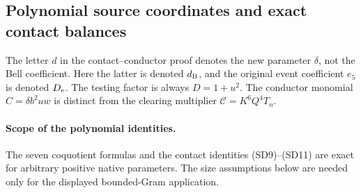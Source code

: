 \subsection{Polynomial source coordinates and exact contact balances}

\label{component:p0acdb66bba2f}

\label{p0acdb66bba2f:app:c1-source-definitions}

The letter $d$ in the contact--conductor proof denotes the new parameter
$\delta$, not the Bell coefficient. Here the latter is denoted $d_{\rm B}$,
and the original event coefficient $e_5$ is denoted $D_{\rm e}$.
The testing factor is always $D=1+u^2$. The conductor monomial
$C=\delta b^2uw$ is distinct from the clearing multiplier
$\mathcal C=K^6Q^4T_n$.

\paragraph{Scope of the polynomial identities.} The seven coquotient formulas and the contact identities (SD9)--(SD11) are exact for arbitrary positive native parameters. The size assumptions below are needed only for the displayed bounded-Gram application.
